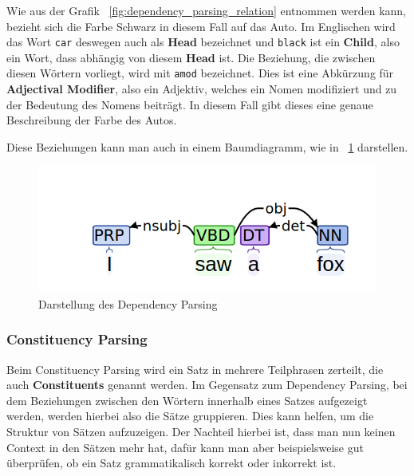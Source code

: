 Wie aus der Grafik ~\ref{fig:dependency_parsing_relation} entnommen werden kann, bezieht sich die Farbe Schwarz in diesem Fall auf das Auto.
Im Englischen wird das Wort \texttt{car} deswegen auch als \textbf{Head} bezeichnet und \texttt{black} ist ein \textbf{Child}, also ein Wort, dass abhängig von diesem \textbf{Head} ist.
Die Beziehung, die zwischen diesen Wörtern vorliegt, wird mit \texttt{amod} bezeichnet.
Dies ist eine Abkürzung für \textbf{Adjectival Modifier}, also ein Adjektiv, welches ein Nomen modifiziert und zu der Bedeutung des Nomens beiträgt.
In diesem Fall gibt dieses eine genaue Beschreibung der Farbe des Autos.\cite{dependencyParsing}

Diese Beziehungen kann man auch in einem Baumdiagramm, wie in ~\ref{fig:dependency_parsing_tree} darstellen.

\begin{figure}[hbt!]
    \centering
    \includegraphics[scale=0.5]{pics/dependency_parse_tree}
    \caption{Darstellung des Dependency Parsing~\cite{dependencyVsConstituencyParsing}}
    \label{fig:dependency_parsing_tree}
\end{figure}

\subsubsection{Constituency Parsing}\label{subsubsec:constituency-parsing}

Beim Constituency Parsing wird ein Satz in mehrere Teilphrasen zerteilt, die auch \textbf{Constituents} genannt werden.
Im Gegensatz zum Dependency Parsing, bei dem Beziehungen zwischen den Wörtern innerhalb eines Satzes aufgezeigt werden, werden hierbei also die Sätze gruppieren.
Dies kann helfen, um die Struktur von Sätzen aufzuzeigen.
Der Nachteil hierbei ist, dass man nun keinen Context in den Sätzen mehr hat, dafür kann man aber beispielsweise gut überprüfen, ob ein Satz grammatikalisch korrekt oder inkorrekt ist.\cite{machineLearningTextAnalysis}

